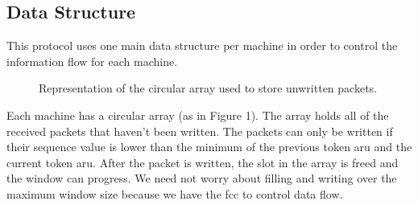 \documentclass[12pt,journal,compsoc]{IEEEtran}
\begin{document}
\subsection{Data Structure}
This protocol uses one main data structure per machine in order to control the information flow for each machine.

\begin{figure}[h]
\centering
{}
\caption{Representation of the circular array used to store unwritten packets.}
\end{figure}

Each machine has a circular array (as in Figure 1). The array holds all of the received packets that haven't been written. The packets can only be written if their sequence value is lower than the minimum of the previous token aru and the current token aru. After the packet is written, the slot in the array is freed and the window can progress. We need not worry about filling and writing over the maximum window size because we have the fcc to control data flow.
\end{document}
